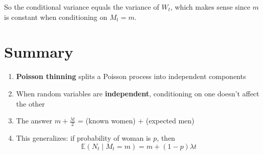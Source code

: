 \documentclass[11pt]{article}
\begin{document}
So the conditional variance equals the variance of $W_t$, which makes sense since $m$ is constant when conditioning on $M_t = m$.

\section{Summary}

\begin{tcolorbox}[colback=gray!5!white,colframe=gray!75!black,title=Key Takeaways]
\begin{enumerate}
    \item \textbf{Poisson thinning} splits a Poisson process into independent components
    \item When random variables are \textbf{independent}, conditioning on one doesn't affect the other
    \item The answer $m + \frac{\lambda t}{2}$ = (known women) + (expected men)
    \item This generalizes: if probability of woman is $p$, then
    \[
    \mathbb{E}(N_t \mid M_t = m) = m + (1-p)\lambda t
    \]
\end{enumerate}
\end{tcolorbox}
\end{document}
